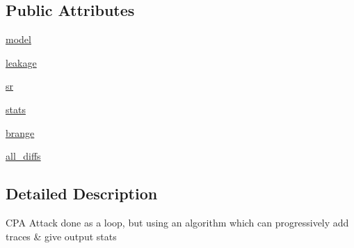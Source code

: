 \subsection*{Public Attributes}
\begin{DoxyCompactItemize}
\item 
\hyperlink{classsoftware_1_1chipwhisperer_1_1analyzer_1_1attacks_1_1cpa__algorithms_1_1progressive_1_1CPAProgressive_a2900a6e0d49d49ad4d1587ef80970af3}{model}
\item 
\hyperlink{classsoftware_1_1chipwhisperer_1_1analyzer_1_1attacks_1_1cpa__algorithms_1_1progressive_1_1CPAProgressive_adfd506df2b2c62432135051e58d8e355}{leakage}
\item 
\hyperlink{classsoftware_1_1chipwhisperer_1_1analyzer_1_1attacks_1_1cpa__algorithms_1_1progressive_1_1CPAProgressive_a106dc20059379dba40e4ef321ae35fd4}{sr}
\item 
\hyperlink{classsoftware_1_1chipwhisperer_1_1analyzer_1_1attacks_1_1cpa__algorithms_1_1progressive_1_1CPAProgressive_a202eee7d3192dae10664aa20cef84667}{stats}
\item 
\hyperlink{classsoftware_1_1chipwhisperer_1_1analyzer_1_1attacks_1_1cpa__algorithms_1_1progressive_1_1CPAProgressive_a66c873c10645a405c0994acd78cb4026}{brange}
\item 
\hyperlink{classsoftware_1_1chipwhisperer_1_1analyzer_1_1attacks_1_1cpa__algorithms_1_1progressive_1_1CPAProgressive_abec0da0ad8394176108af5d773b02687}{all\+\_\+diffs}
\end{DoxyCompactItemize}


\subsection{Detailed Description}
\begin{DoxyVerb}CPA Attack done as a loop, but using an algorithm which can progressively add traces & give output stats
\end{DoxyVerb}
 

